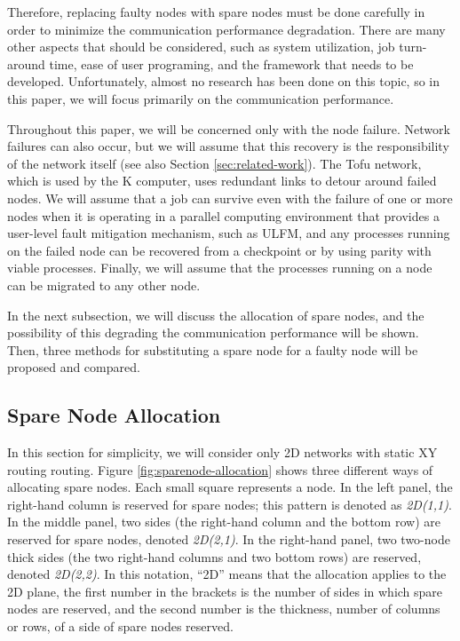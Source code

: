 \documentclass[Afour,times,sagev]{sagej}
\begin{document}
Therefore, replacing faulty nodes with spare nodes must be done
carefully in order to minimize the communication performance
degradation. There are many other aspects that should be considered,
such as system utilization, job turn-around time, ease of user
programing, and the framework that needs to be
developed. Unfortunately, almost no research has been done on this
topic, so in this paper, we will focus primarily on the communication
performance.

Throughout this paper, we will be concerned only with the node
failure. Network failures can also occur, but we will assume that this
recovery is the responsibility of the network
itself\citep{Domke:2014:FND:2683593.2683659} (see also Section
\ref{sec:related-work}). The Tofu network, which is used by the K
computer, uses redundant links to detour around failed
nodes\citep{sumimoto-k}. We will assume that a job can survive even
with the failure of one or more nodes when it is operating in a
parallel computing environment that provides a user-level fault
mitigation mechanism, such as ULFM, and any processes running on the
failed node can be recovered from a checkpoint or by using parity with
viable processes. Finally, we will assume that the processes running
on a node can be migrated to any other node.

In the next subsection, we will discuss the allocation of spare nodes, and
the possibility of this degrading the communication performance will be
shown. Then, three methods for substituting a spare node for a faulty
node will be proposed and compared.

\subsection{Spare Node Allocation}\label{sec:spare-alloc}

In this section for simplicity, we will consider only 2D networks with
static XY routing routing\citep{Zhang:2009:CRX:1603897.1605067}.
Figure \ref{fig:sparenode-allocation} shows three different ways of
allocating spare nodes. Each small square represents a node. In the
left panel, the right-hand column is reserved for spare nodes; this
pattern is denoted as {\it 2D(1,1)}. In the middle panel, two sides
(the right-hand column and the bottom row) are reserved for spare
nodes, denoted {\it 2D(2,1)}. In the right-hand panel, two two-node
thick sides (the two right-hand columns and two bottom rows) are
reserved, denoted {\it 2D(2,2)}. In this notation, ``2D'' means that
the allocation applies to the 2D plane, the first number in the
brackets is the number of sides in which spare nodes are reserved, and
the second number is the thickness, number of columns or rows, of a
side of spare nodes reserved.
\end{document}
